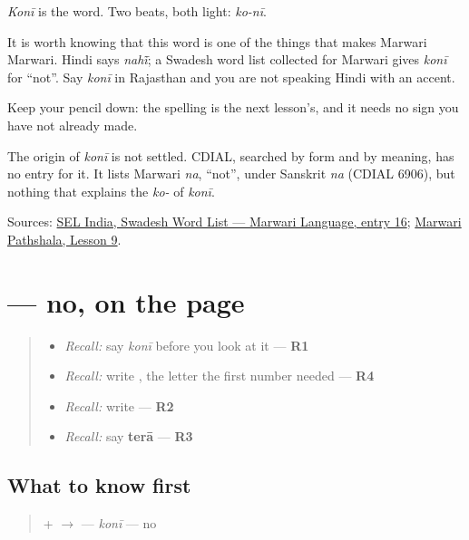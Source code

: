 \emph{Konī} is the word. Two beats, both light: \emph{ko-nī}.

It is worth knowing that this word is one of the things that makes Marwari Marwari. Hindi says \emph{nahī̃}; a Swadesh word list collected for Marwari gives \emph{konī} for \textquotedblleft{}not\textquotedblright{}. Say \emph{konī} in Rajasthan and you are not speaking Hindi with an accent.

Keep your pencil down: the spelling is the next lesson's, and it needs no sign you have not already made.

\begin{cousinweb}
The origin of \emph{konī} is not settled. CDIAL, searched by form and by meaning, has no entry for it. It lists Marwari \emph{na}, \textquotedblleft{}not\textquotedblright{}, under Sanskrit \emph{na} (CDIAL 6906), but nothing that explains the \emph{ko-} of \emph{konī}.
\end{cousinweb}

\begin{tcolorbox}[breakable,colback=teal!4,colframe=teal!35!black,title={Before you move on}]
Sources: \href{https://selindia.org/wp-content/uploads/2025/05/SWL-Marwari\_IPA.pdf}{SEL India, Swadesh Word List — Marwari Language, entry 16}; \href{https://www.marwaripathshala.com/marwari-lesson-9-english}{Marwari Pathshala, Lesson 9}.
\end{tcolorbox}
\section[\texorpdfstring{\mw{कोनी} (konī)}{कोनी (konī)}]{ — no, on the page}

\label{lesson:MW-C39-koni}



\begin{quote}
\begin{itemize}
\raggedright
  \item \emph{Recall:} say \emph{konī} before you look at it — \textbf{R1}
  \item \emph{Recall:} write \textbf{}, the letter the first number needed — \textbf{R4}
  \item \emph{Recall:} write \textbf{} — \textbf{R2}
  \item \emph{Recall:} say \textbf{terā} — \textbf{R3}
\end{itemize}
\end{quote}

\subsection*{What to know first}
\begin{quote}
\textbf{} + \textbf{} $\to$ \textbf{} — \emph{konī} — no
\end{quote}

